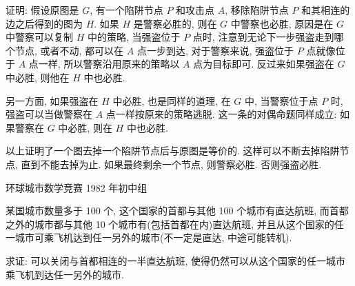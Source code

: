 证明: 假设原图是 $ G $, 有一个陷阱节点 $ P $ 和攻击点 $ A $, 移除陷阱节点 $ P $ 和其相连的边之后得到的图为 $ H $. 如果 $ H $ 是警察必胜的, 则在 $ G $ 中警察也必胜, 原因是在 $ G $ 中警察可以复制 $ H $ 中的策略, 当强盗位于 $ P $ 点时, 注意到无论下一步强盗走到哪个节点, 或者不动, 都可以在 $ A $ 点一步到达, 对于警察来说, 强盗位于 $ P $ 点就像位于 $ A $ 点一样, 所以警察沿用原来的策略以 $ A $ 点为目标即可. 反过来如果强盗在 $ G $ 中必胜, 则他在 $ H $ 中也必胜. 

另一方面, 如果强盗在 $ H $ 中必胜, 也是同样的道理, 在 $ G $ 中, 当警察位于点 $ P $ 时, 强盗可以当做警察在
$ A $ 点一样按原来的策略逃脱. 这一条的对偶命题同样成立: 如果警察在 $ G $ 中必胜, 则在 $ H $ 中也必胜.

以上证明了一个图去掉一个陷阱节点后与原图是等价的. 这样可以不断去掉陷阱节点, 直到不能去掉为止. 如果最终剩余一个节点, 则警察必胜. 否则强盗必胜.

\newpage
\noindent 环球城市数学竞赛 1982 年初中组

某国城市数量多于 100 个, 这个国家的首都与其他 100 个城市有直达航班, 而首都之外的城市都与其他 10 个城市有(包括首都在内)直达航班, 并且从这个国家的任一城市可乘飞机达到任一另外的城市(不一定是直达, 中途可能转机). 

求证: 可以关闭与首都相连的一半直达航班, 使得仍然可以从这个国家的任一城市乘飞机到达任一另外的城市.

~

